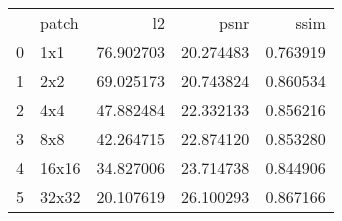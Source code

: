 \begin{tabular}{llrrr}
 & patch & l2 & psnr & ssim \\
0 & 1x1 & 76.902703 & 20.274483 & 0.763919 \\
1 & 2x2 & 69.025173 & 20.743824 & 0.860534 \\
2 & 4x4 & 47.882484 & 22.332133 & 0.856216 \\
3 & 8x8 & 42.264715 & 22.874120 & 0.853280 \\
4 & 16x16 & 34.827006 & 23.714738 & 0.844906 \\
5 & 32x32 & 20.107619 & 26.100293 & 0.867166 \\
\end{tabular}

